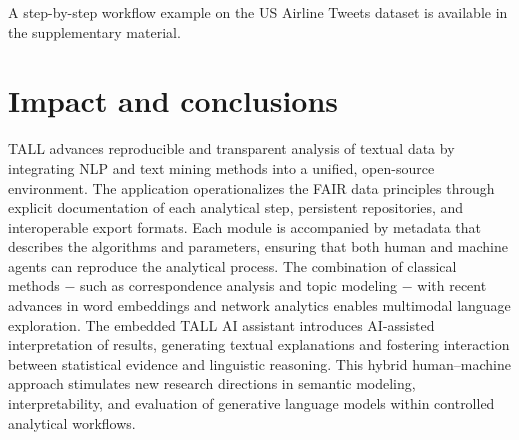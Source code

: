 \documentclass[preprint,12pt,a4paper]{elsarticle}
\begin{document}
A step-by-step workflow example on the US Airline Tweets dataset is available in the supplementary material.

\section{Impact and conclusions}
TALL advances reproducible and transparent analysis of textual data by integrating NLP and text mining methods into a unified, open-source environment. The application operationalizes the FAIR data principles through explicit documentation of each analytical step, persistent repositories, and interoperable export formats. Each module is accompanied by metadata that describes the algorithms and parameters, ensuring that both human and machine agents can reproduce the analytical process. The combination of classical methods $-$ such as correspondence analysis and topic modeling $-$ with recent advances in word embeddings and network analytics enables multimodal language exploration. The embedded TALL AI assistant introduces AI-assisted interpretation of results, generating textual explanations and fostering interaction between statistical evidence and linguistic reasoning. This hybrid human–machine approach stimulates new research directions in semantic modeling, interpretability, and evaluation of generative language models within controlled analytical workflows.
\end{document}

